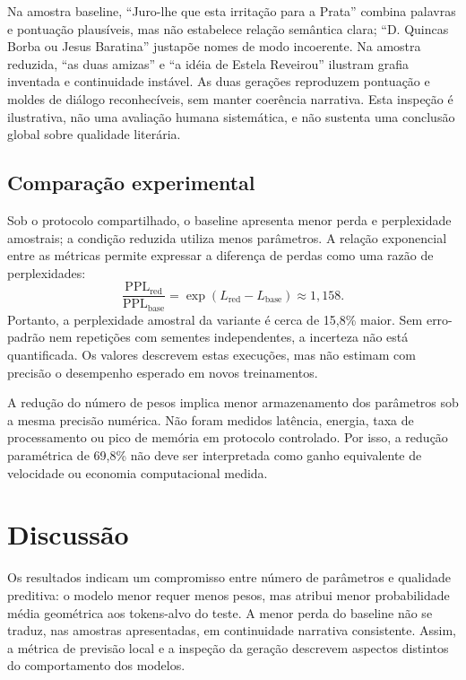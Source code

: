\documentclass[conference]{IEEEtran}
\begin{document}
Na amostra baseline, “Juro-lhe que esta irritação para a Prata” combina palavras e pontuação plausíveis, mas não estabelece relação semântica clara; “D. Quincas Borba ou Jesus Baratina” justapõe nomes de modo incoerente. Na amostra reduzida, “as duas amizas” e “a idéia de Estela Reveirou” ilustram grafia inventada e continuidade instável. As duas gerações reproduzem pontuação e moldes de diálogo reconhecíveis, sem manter coerência narrativa. Esta inspeção é ilustrativa, não uma avaliação humana sistemática, e não sustenta uma conclusão global sobre qualidade literária.

\subsection{Comparação experimental}

Sob o protocolo compartilhado, o baseline apresenta menor perda e perplexidade amostrais; a condição reduzida utiliza menos parâmetros. A relação exponencial entre as métricas permite expressar a diferença de perdas como uma razão de perplexidades:
\begin{equation}
\frac{\mathrm{PPL}_{\mathrm{red}}}{\mathrm{PPL}_{\mathrm{base}}}
=\exp(L_{\mathrm{red}}-L_{\mathrm{base}})\approx 1{,}158.
\end{equation}
Portanto, a perplexidade amostral da variante é cerca de 15,8\% maior. Sem erro-padrão nem repetições com sementes independentes, a incerteza não está quantificada. Os valores descrevem estas execuções, mas não estimam com precisão o desempenho esperado em novos treinamentos.

A redução do número de pesos implica menor armazenamento dos parâmetros sob a mesma precisão numérica. Não foram medidos latência, energia, taxa de processamento ou pico de memória em protocolo controlado. Por isso, a redução paramétrica de 69,8\% não deve ser interpretada como ganho equivalente de velocidade ou economia computacional medida.

\section{Discussão}

Os resultados indicam um compromisso entre número de parâmetros e qualidade preditiva: o modelo menor requer menos pesos, mas atribui menor probabilidade média geométrica aos tokens-alvo do teste. A menor perda do baseline não se traduz, nas amostras apresentadas, em continuidade narrativa consistente. Assim, a métrica de previsão local e a inspeção da geração descrevem aspectos distintos do comportamento dos modelos.
\end{document}
